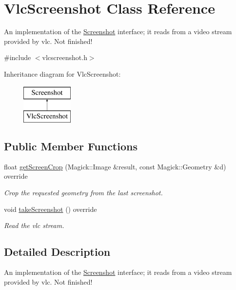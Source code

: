 \hypertarget{classVlcScreenshot}{}\section{Vlc\+Screenshot Class Reference}
\label{classVlcScreenshot}


An implementation of the \hyperlink{classScreenshot}{Screenshot} interface; it reads from a video stream provided by vlc. Not finished!  




{\ttfamily \#include $<$vlcscreenshot.\+h$>$}

Inheritance diagram for Vlc\+Screenshot\+:\begin{figure}[H]
\begin{center}
\leavevmode
\includegraphics[height=2.000000cm]{classVlcScreenshot}
\end{center}
\end{figure}
\subsection*{Public Member Functions}
\begin{DoxyCompactItemize}
\item 
float \hyperlink{classVlcScreenshot_a2edc869b862ef8569de2c680c7621d0b}{get\+Screen\+Crop} (Magick\+::\+Image \&result, const Magick\+::\+Geometry \&d) override
\begin{DoxyCompactList}\small\item\em Crop the requested geometry from the last screenshot. \end{DoxyCompactList}\item 
void \hyperlink{classVlcScreenshot_a2d577851637459ce255eb4108ed8e0d8}{take\+Screenshot} () override\hypertarget{classVlcScreenshot_a2d577851637459ce255eb4108ed8e0d8}{}\label{classVlcScreenshot_a2d577851637459ce255eb4108ed8e0d8}

\begin{DoxyCompactList}\small\item\em Read the vlc stream. \end{DoxyCompactList}\end{DoxyCompactItemize}


\subsection{Detailed Description}
An implementation of the \hyperlink{classScreenshot}{Screenshot} interface; it reads from a video stream provided by vlc. Not finished! 

